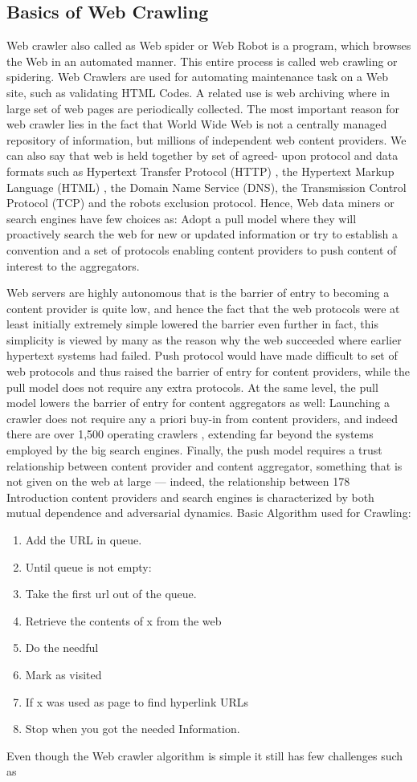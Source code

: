 \documentclass[12pt]{report}
\begin{document}
\subsection*{Basics of Web Crawling}
Web crawler also called as Web spider or Web Robot is a program, which browses the Web in an automated manner. This entire process is called web crawling or spidering. Web Crawlers are used for automating maintenance task on a Web site, such as validating HTML Codes. A related use is web archiving where in large set of web pages are periodically collected. The most important reason for web crawler lies in the fact that World Wide Web is not a centrally managed repository of information, but millions of independent web content providers. We can also say that web is held together by set of agreed- upon protocol and data formats such as Hypertext Transfer Protocol (HTTP) , the Hypertext Markup Language (HTML) , the Domain Name Service (DNS), the Transmission Control Protocol (TCP) and the robots exclusion protocol. Hence, Web data miners or search engines have few choices as: Adopt a pull model where they will proactively search the web for new or updated information or try to establish a convention and a set of protocols enabling content providers to push content of interest to the aggregators. 

Web servers are highly autonomous that is the barrier of entry to becoming a content provider is quite low, and hence the fact that the web protocols were at least initially extremely simple lowered the barrier even further in fact, this simplicity is viewed by many as the reason why the web succeeded where earlier hypertext systems had failed. Push protocol would have made difficult to set of web protocols and thus raised the barrier of entry for content providers, while the pull model does not require any extra protocols. At the same level, the pull model lowers the barrier of entry for content aggregators as well: Launching a crawler does not require any a priori buy-in from content providers, and indeed there are over 1,500 operating crawlers , extending far beyond the systems employed by the big search engines. Finally, the push model requires a trust relationship between content provider and content aggregator, something that is not given on the web at large — indeed, the relationship between 178 Introduction content providers and search engines is characterized by both mutual dependence and adversarial dynamics. 
Basic Algorithm used for Crawling:
\begin{enumerate} [label=(\alph*)]
\item	Add the URL in queue.
\item	Until queue is not empty:
\item  Take the first url out of the queue.
\item Retrieve the contents of x from the web
\item Do the needful
\item Mark as visited
\item If x was used as page to find hyperlink URLs
\item Stop when you got the needed Information.
\end{enumerate}
Even though the Web crawler algorithm is simple it still has few challenges such as 
\end{document}
